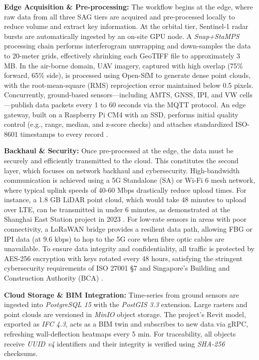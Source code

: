 \documentclass[preprint,11pt,authoryear,3p]{elsarticle}
\begin{document}
\textbf{Edge Acquisition \& Pre-processing:} The workflow begins at the edge, where raw data from all three SAG tiers are acquired and pre-processed locally to reduce volume and extract key information. At the orbital tier, Sentinel-1 radar bursts are automatically ingested by an on-site GPU node. A \textit{Snap+StaMPS} processing chain performs interferogram unwrapping and down-samples the data to 20-meter grids, effectively shrinking each GeoTIFF file to approximately 3 MB. In the air-borne domain, UAV imagery, captured with high overlap (75\% forward, 65\% side), is processed using Open-SfM to generate dense point clouds, with the root-mean-square (RMS) reprojection error maintained below 0.5 pixels. Concurrently, ground-based sensors—including AMTS, GNSS, IPI, and VW cells—publish data packets every 1 to 60 seconds via the MQTT protocol. An edge gateway, built on a Raspberry Pi CM4 with an SSD, performs initial quality control (e.g., range, median, and z-score checks) and attaches standardized ISO-8601 timestamps to every record \citep{iso8601-1:2019}.

\textbf{Backhaul \& Security:} Once pre-processed at the edge, the data must be securely and efficiently transmitted to the cloud. This constitutes the second layer, which focuses on network backhaul and cybersecurity. High-bandwidth communication is achieved using a 5G Standalone (SA) or Wi-Fi 6 mesh network, where typical uplink speeds of 40-60 Mbps drastically reduce upload times. For instance, a 1.8 GB LiDAR point cloud, which would take 48 minutes to upload over LTE, can be transmitted in under 6 minutes, as demonstrated at the Shanghai East Station project in 2023 \citep{LI2023105243}. For low-rate sensors in areas with poor connectivity, a LoRaWAN bridge provides a resilient data path, allowing FBG or IPI data (at 9.6 kbps) to hop to the 5G core when fibre optic cables are unavailable. To ensure data integrity and confidentiality, all traffic is protected by AES-256 encryption with keys rotated every 48 hours, satisfying the stringent cybersecurity requirements of ISO 27001 §7 and Singapore's Building and Construction Authority (BCA) \citep{BCA_Rigorous_Approach_2022}.

\textbf{Cloud Storage \& BIM Integration:} Time-series from ground sensors are ingested into \textit{PostgreSQL 15}\citep{PostgreSQL15} with the \textit{PostGIS 3.3}\citep{PostGIS33} extension. Large rasters and point clouds are versioned in \textit{MinIO}\citep{MinIO2022} object storage. The project's Revit model, exported as \textit{IFC 4.3}\citep{IFC43}, acts as a BIM twin and subscribes to new data via gRPC, refreshing wall-deflection heatmaps every 5 min. For traceability, all objects receive \textit{UUID v4}\citep{UUIDv4RFC} identifiers and their integrity is verified using \textit{SHA-256}\citep{SHA256FIPS180} checksums.
\end{document}
